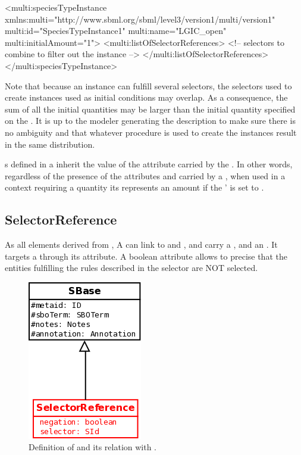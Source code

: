 \begin{example}
<multi:speciesTypeInstance 
         xmlns:multi="http://www.sbml.org/sbml/level3/version1/multi/version1" 
         multi:id="SpeciesTypeInstance1"
         multi:name="LGIC_open"
         multi:initialAmount="1">
  <multi:listOfSelectorReferences>
    <!-- selectors to combine to filter out the instance -->
  </multi:listOfSelectorReferences>
</multi:speciesTypeInstance>
\end{example}

Note that because an instance can fulfill several selectors, the selectors used to create instances used as initial conditions may overlap. As a consequence, the sum of all the initial quantities may be larger than the initial quantity specified on the . It is up to the modeler generating the description to make sure there is no ambiguity and that whatever procedure is used to create the instances result in the same distribution.

s defined in a  inherit the value of the attribute  carried by the . In other words, regardless of the presence of the attributes  and  carried by a , when used in a context requiring a quantity its  represents an amount if  the '  is set to . 

\subsection{SelectorReference}\label{sec:SelectorReference}

As all elements derived from , A   can link to  and , and carry a , and an . It targets a  through its  attribute. A boolean attribute  allows to precise that the entities fulfilling the rules described in the selector are NOT selected.

\begin{figure}[H]
\begin{center}
\includegraphics[scale=0.3]{figs/pngs/SelectorReferenceClass.png} 
\caption{Definition of  and its relation with .}
\label{fig:SelectorReferenceClass}
\end{center}
\end{figure}

